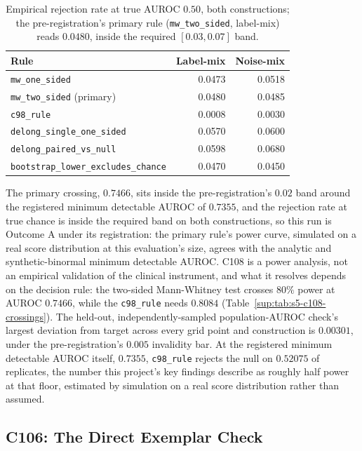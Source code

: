 \begin{table}[H]
\caption[C108 rejection rate at true chance]{Empirical rejection rate at true
AUROC $0.50$, both constructions; the pre-registration's primary rule
(\texttt{mw\_two\_sided}, label-mix) reads $0.0480$, inside the required
$[0.03, 0.07]$ band.}
\centering
\begin{tabular}{lrr}
\toprule
\textbf{Rule} & \textbf{Label-mix} & \textbf{Noise-mix} \\
\midrule
\texttt{mw\_one\_sided}                & 0.0473 & 0.0518 \\
\texttt{mw\_two\_sided} (primary)      & 0.0480 & 0.0485 \\
\texttt{c98\_rule}                     & 0.0008 & 0.0030 \\
\texttt{delong\_single\_one\_sided}    & 0.0570 & 0.0600 \\
\texttt{delong\_paired\_vs\_null}      & 0.0598 & 0.0680 \\
\texttt{bootstrap\_lower\_excludes\_chance} & 0.0470 & 0.0450 \\
\bottomrule
\end{tabular}
\label{sup:tab:s5-c108-chance}
\end{table}

The primary crossing, $0.7466$, sits inside the pre-registration's $0.02$
band around the registered minimum detectable AUROC of $0.7355$, and
the rejection rate at true chance is inside the required band on both
constructions, so this run is Outcome A under its registration: the primary
rule's power curve, simulated on a real score distribution at this
evaluation's size, agrees with the analytic and synthetic-binormal minimum
detectable AUROC. C108 is a power analysis, not an empirical validation of
the clinical instrument, and what it resolves depends on the decision rule:
the two-sided Mann-Whitney test crosses $80\%$ power at AUROC $0.7466$, while
the \texttt{c98\_rule} needs $0.8084$ (Table~\ref{sup:tab:s5-c108-crossings}).
The held-out,
independently-sampled population-AUROC check's largest deviation from target
across every grid point and construction is $0.00301$, under the
pre-registration's $0.005$ invalidity bar. At the registered minimum
detectable AUROC itself, $0.7355$, \texttt{c98\_rule} rejects the null on
$0.52075$ of replicates, the number this project's key findings describe as
roughly half power at that floor, estimated by simulation on a real score
distribution rather than assumed.

\subsection{C106: The Direct Exemplar Check}
\label{sup:sec:s5-c106}


